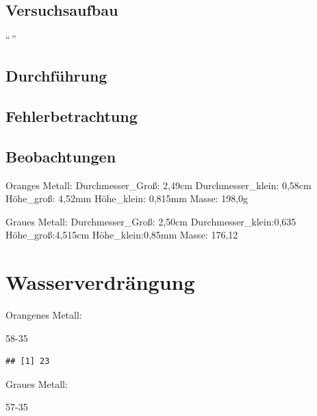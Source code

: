 \documentclass[
  9pt,
]{article}
\newenvironment{Shaded}{\begin{snugshade}}{\end{snugshade}}
\newcommand{\DecValTok}[1]{\textcolor[rgb]{0.00,0.00,0.81}{#1}}
\begin{document}
\hypertarget{versuchsaufbau}{%
\subsection{Versuchsaufbau}\label{versuchsaufbau}}

``\,''

\hypertarget{durchfuxfchrung}{%
\subsection{Durchführung}\label{durchfuxfchrung}}

\hypertarget{fehlerbetrachtung-1}{%
\subsection{Fehlerbetrachtung}\label{fehlerbetrachtung-1}}

\hypertarget{beobachtungen-1}{%
\subsection{Beobachtungen}\label{beobachtungen-1}}

Oranges Metall: Durchmesser\_Groß: 2,49cm Durchmesser\_klein: 0,58cm
Höhe\_groß: 4,52mm Höhe\_klein: 0,815mm Masse: 198,0g

Graues Metall: Durchmesser\_Groß: 2,50cm Durchmesser\_klein:0,635
Höhe\_groß:4,515cm Höhe\_klein:0,85mm Masse: 176,12

\hypertarget{wasserverdruxe4ngung}{%
\section{Wasserverdrängung}\label{wasserverdruxe4ngung}}

Orangenes Metall:

\begin{Shaded}
\begin{Highlighting}[]
\DecValTok{58{-}35}
\end{Highlighting}
\end{Shaded}

\begin{verbatim}
## [1] 23
\end{verbatim}

Graues Metall:

\begin{Shaded}
\begin{Highlighting}[]
\DecValTok{57{-}35}
\end{Highlighting}
\end{Shaded}
\end{document}
